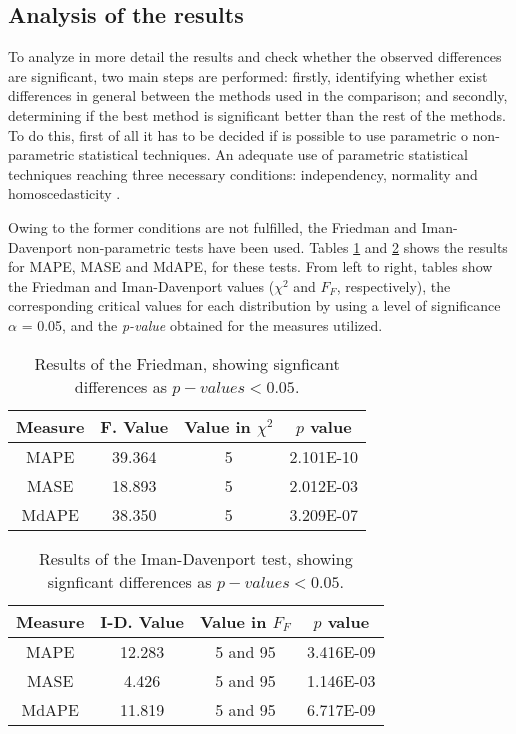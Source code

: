 \documentclass[a4paper,twoside]{article}
\begin{document}
\subsection{Analysis of the results}
\label{analysisresults}

\noindent To analyze in more detail the results and check whether the observed differences are significant, two main steps are performed: firstly, identifying whether exist differences in general between the methods used in the comparison; and secondly, determining if the best method is significant better than the rest of the methods. To do this, first of all it has to be decided if is possible to use parametric o non-parametric statistical techniques. An adequate use of parametric statistical techniques reaching three necessary conditions: independency, normality and homoscedasticity \cite{Sheskin2004}. 

Owing to the former conditions are not fulfilled, the Friedman and Iman-Davenport non-parametric tests have been used. Tables \ref{tab:Friedman} and \ref{tab:ImanDavenport} 
  shows the results for MAPE, MASE and MdAPE, for these tests. From left to right, tables show the Friedman and Iman-Davenport values ($\chi^2$ and $F_F$, respectively), the corresponding critical values for each distribution by using a level of significance $\alpha$ = 0.05, and the \emph{p-value} obtained for the measures utilized.

    \begin{table}[h]
        \caption{Results of the Friedman, showing signficant differences as $p-values<0.05$.}
        \label{tab:Friedman}
        \centering
        \begin{tabular}{|c|c|c|c|}
         \hline Measure & F. Value & Value in $\chi^2$ & $p$ value \\
         \hline MAPE	&	39.364	&	5	&	2.101E-10	\\
         \hline MASE	&	18.893	&	5	&	2.012E-03	\\
         \hline MdAPE	&	38.350	&	5	&	3.209E-07	\\
         \hline
        \end{tabular}
    \end{table}

    \begin{table}[h]
        \caption{Results of the Iman-Davenport test, showing signficant differences as $p-values<0.05$. }
        \label{tab:ImanDavenport}
        \centering
        \begin{tabular}{|c|c|c|c|}
         \hline Measure &  I-D. Value & Value in $F_F$ & $p$ value \\
         \hline MAPE	&	12.283	&	5 and 95	&	3.416E-09\\
         \hline MASE	&	4.426	&	5 and 95	&	1.146E-03\\
         \hline MdAPE	&	11.819	&	5 and 95	&	6.717E-09\\
         \hline
        \end{tabular}
    \end{table}
      
\end{document}
